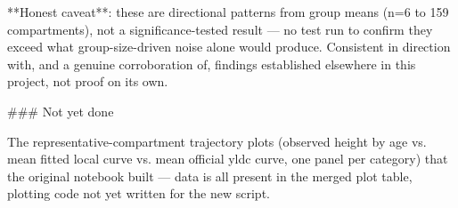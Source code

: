 **Honest caveat**: these are directional patterns from group means (n=6 to 159 compartments), not a
significance-tested result — no test run to confirm they exceed what group-size-driven noise alone
would produce. Consistent in direction with, and a genuine corroboration of, findings established
elsewhere in this project, not proof on its own.

### Not yet done

The representative-compartment trajectory plots (observed height by age vs. mean fitted local curve
vs. mean official yldc curve, one panel per category) that the original notebook built — data is
all present in the merged plot table, plotting code not yet written for the new script.

